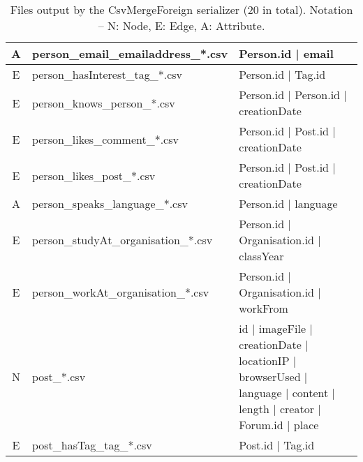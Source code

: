 \begin{table}[htb]
{\begin{tabular}{|c|p{4.3cm}|p{12.4cm}|}
        A                       & person\_email\_emailaddress\_*.csv   & Person.id | email                                                                                                   \\ \hline
        E                       & person\_hasInterest\_tag\_*.csv      & Person.id | Tag.id                                                                                                  \\ \hline
        E                       & person\_knows\_person\_*.csv         & Person.id | Person.id | creationDate                                                                                \\ \hline
        E                       & person\_likes\_comment\_*.csv        & Person.id | Post.id | creationDate                                                                                  \\ \hline
        E                       & person\_likes\_post\_*.csv           & Person.id | Post.id | creationDate                                                                                  \\ \hline
        A                       & person\_speaks\_language\_*.csv      & Person.id | language                                                                                                \\ \hline
        E                       & person\_studyAt\_organisation\_*.csv & Person.id | Organisation.id | classYear                                                                             \\ \hline
        E                       & person\_workAt\_organisation\_*.csv  & Person.id | Organisation.id | workFrom                                                                              \\ \hline
        N                       & post\_*.csv                          & id | imageFile | creationDate | locationIP | browserUsed | language | content | length | creator | Forum.id | place \\ \hline
        E                       & post\_hasTag\_tag\_*.csv             & Post.id | Tag.id                                                                                                    \\ \hline
    \end{tabular}}
    \caption{Files output by the CsvMergeForeign serializer (20 in total). Notation -- N: Node, E: Edge, A: Attribute.}
    \label{table:csv_merge_foreign}
\end{table}
